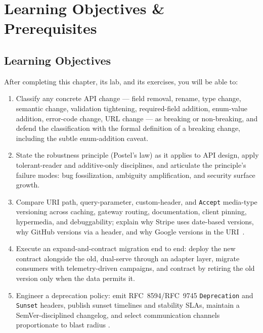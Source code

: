 \section{Learning Objectives \& Prerequisites}
\label{sec:ch9-objectives}

\subsection*{Learning Objectives}
After completing this chapter, its lab, and its exercises, you will be able to:

\begin{enumerate}[label=\textbf{LO-\arabic*.}, leftmargin=2.6cm]
  \item Classify any concrete API change --- field removal, rename, type
        change, semantic change, validation tightening, required-field
        addition, enum-value addition, error-code change, URL change --- as
        breaking or non-breaking, and defend the classification with the
        formal definition of a breaking change, including the subtle
        enum-addition caveat.
  \item State the robustness principle (Postel's law) as it applies to API
        design, apply tolerant-reader and additive-only disciplines, and
        articulate the principle's failure modes: bug fossilization, ambiguity
        amplification, and security surface growth.
  \item Compare URI path, query-parameter, custom-header, and
        \texttt{Accept} media-type versioning across caching, gateway routing,
        documentation, client pinning, hypermedia, and debuggability; explain
        why Stripe uses date-based versions, why GitHub versions via a header,
        and why Google versions in the URI~\cite{gehl2021apidesign}.
  \item Execute an expand-and-contract migration end to end: deploy the new
        contract alongside the old, dual-serve through an adapter layer,
        migrate consumers with telemetry-driven campaigns, and contract by
        retiring the old version only when the data permits it.
  \item Engineer a deprecation policy: emit RFC~8594/RFC~9745
        \texttt{Deprecation} and \texttt{Sunset} headers, publish sunset
        timelines and stability SLAs, maintain a SemVer-disciplined changelog,
        and select communication channels proportionate to blast radius
        \cite{rfc8594}.

\end{enumerate}
